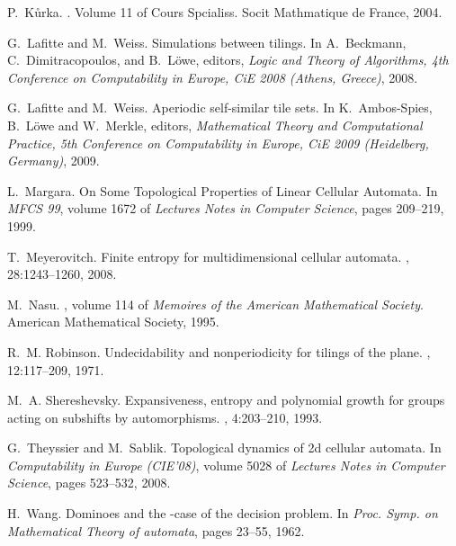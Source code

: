 \documentclass{llncs}
\begin{document}
\begin{thebibliography}{10}
P.~K{\r{u}}rka.
.
\newblock Volume 11 of Cours Spcialiss.
  Socit Mathmatique de France, 2004.

G.~Lafitte and M.~Weiss.
\newblock Simulations between tilings.
\newblock In A.~Beckmann, C.~Dimitracopoulos, and B.~L{\"o}we, editors, {\em
  Logic and Theory of Algorithms, 4th Conference on Computability in Europe,
  CiE 2008 (Athens, Greece)}, 2008.

G.~Lafitte and M.~Weiss.
\newblock Aperiodic self-similar tile sets.
\newblock In K.~Ambos-Spies, B.~L{\"o}we and W.~Merkle, editors, {\em
Mathematical Theory and Computational Practice, 5th Conference
on Computability in Europe, CiE 2009 (Heidelberg, Germany)}, 2009.

L.~Margara.
\newblock On Some Topological Properties of Linear Cellular Automata.
\newblock In {\em MFCS 99}, volume 1672 of {\em
  Lectures Notes in Computer Science}, pages 209--219, 1999.

T.~Meyerovitch.
\newblock Finite entropy for multidimensional cellular automata.
, 28:1243--1260, 2008.

M.~Nasu.
, volume 114 of {\em Memoires of the {A}merican {M}athematical
  {S}ociety}.
\newblock American Mathematical Society, 1995.

R.~M. Robinson.
\newblock Undecidability and nonperiodicity for tilings of the plane.
, 12:117--209, 1971.

M.~A. Shereshevsky.
\newblock Expansiveness, entropy and polynomial growth for groups acting on
  subshifts by automorphisms.
, 4:203--210, 1993.

G.~Theyssier and M.~Sablik.
\newblock Topological dynamics of 2d cellular automata.
\newblock In {\em Computability in Europe (CIE'08)}, volume 5028 of {\em
  Lectures Notes in Computer Science}, pages 523--532, 2008.

H.~Wang.
\newblock Dominoes and the {}-case of the decision
  problem.
\newblock In {\em Proc. Symp. on Mathematical Theory of automata}, pages
  23--55, 1962.

\end{thebibliography}
\end{document}
